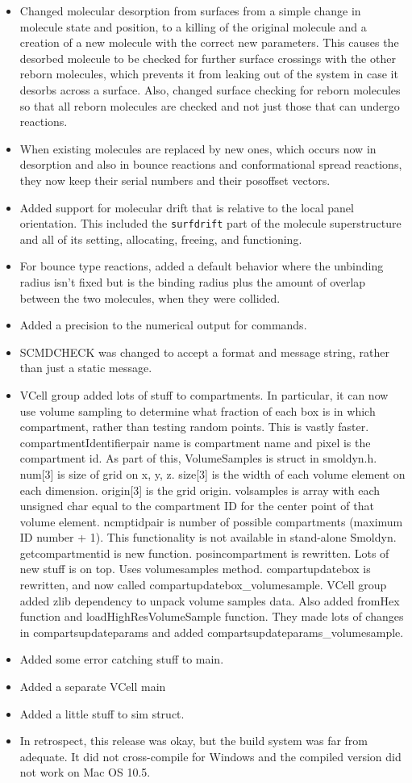 \documentclass {scrbook}
\newcommand {\ttt} {\texttt}
\begin{document}
\begin{itemize}
\item Changed molecular desorption from surfaces from a simple change in molecule state and position, to a killing of the original molecule and a creation of a new molecule with the correct new parameters. This causes the desorbed molecule to be checked for further surface crossings with the other reborn molecules, which prevents it from leaking out of the system in case it desorbs across a surface. Also, changed surface checking for reborn molecules so that all reborn molecules are checked and not just those that can undergo reactions.
\item When existing molecules are replaced by new ones, which occurs now in desorption and also in bounce reactions and conformational spread reactions, they now keep their serial numbers and their posoffset vectors.
\item Added support for molecular drift that is relative to the local panel orientation. This included the \ttt{surfdrift} part of the molecule superstructure and all of its setting, allocating, freeing, and functioning.
\item For bounce type reactions, added a default behavior where the unbinding radius isn't fixed but is the binding radius plus the amount of overlap between the two molecules, when they were collided.
\item Added a precision to the numerical output for commands.
\item SCMDCHECK was changed to accept a format and message string, rather than just a static message.
\item VCell group added lots of stuff to compartments. In particular, it can now use volume sampling to determine what fraction of each box is in which compartment, rather than testing random points. This is vastly faster. compartmentIdentifierpair name is compartment name and pixel is the compartment id. As part of this, VolumeSamples is struct in smoldyn.h. num[3] is size of grid on x, y, z. size[3] is the width of each volume element on each dimension. origin[3] is the grid origin. volsamples is array with each unsigned char equal to the compartment ID for the center point of that volume element. ncmptidpair is number of possible compartments (maximum ID number + 1). This functionality is not available in stand-alone Smoldyn. getcompartmentid is new function. posincompartment is rewritten. Lots of new stuff is on top. Uses volumesamples method. compartupdatebox is rewritten, and now called compartupdatebox\_volumesample. VCell group added zlib dependency to unpack volume samples data. Also added fromHex function and loadHighResVolumeSample function. They made lots of changes in compartsupdateparams and added compartsupdateparams\_volumesample.
\item Added some error catching stuff to main.
\item Added a separate VCell main
\item Added a little stuff to sim struct.
\item In retrospect, this release was okay, but the build system was far from adequate. It did not cross-compile for Windows and the compiled version did not work on Mac OS 10.5.
\end{itemize}
\end{document}
